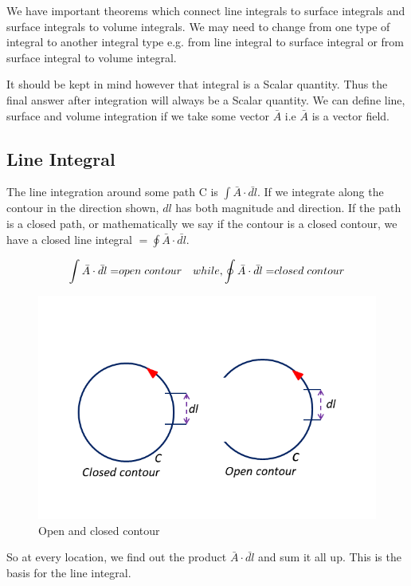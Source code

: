 We have important theorems which connect line integrals to surface integrals and surface integrals to volume integrals. We may need to change from one type of integral to another integral type e.g. from line integral to surface integral or from surface integral to volume integral.

It should be kept in mind however that integral is a Scalar quantity. Thus the final answer after integration will always be a Scalar quantity. We can define line, surface and volume integration if we take some vector $\bar{A}$ i.e $\bar{A}$ is a vector field. 

\subsection{Line Integral}

The line integration around some path C is ${\displaystyle \int  \bar{A} \cdot \bar{dl}}$. If we integrate along the contour in the direction shown, $dl$ has both magnitude and direction. If the path is a closed path, or mathematically we say if the contour is a closed contour, we have a closed line integral $= {\displaystyle \oint  \bar{A} \cdot \bar{dl}}$.

\begin{equation}
{\displaystyle \int  \bar{A} \cdot \bar{dl} = }open\; contour\quad while, \newline  {\displaystyle \oint  \bar{A} \cdot \bar{dl}= }closed\; contour
\end{equation}
\begin{figure}
\centering
\includegraphics[width=0.9\linewidth]{./graphics/fig17.4}
\caption{Open and closed contour}
\end{figure}

So at every location, we find out the product $\bar{A} \cdot \bar{dl}$ and sum it all up. This is the basis for the line integral.
